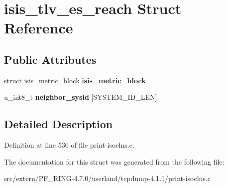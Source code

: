 \hypertarget{structisis__tlv__es__reach}{
\section{isis\_\-tlv\_\-es\_\-reach Struct Reference}
\label{structisis__tlv__es__reach}
}
\subsection*{Public Attributes}
\begin{DoxyCompactItemize}
\item 
\hypertarget{structisis__tlv__es__reach_a25013ad5e96d246910fb5a57a9937166}{
struct \hyperlink{structisis__metric__block}{isis\_\-metric\_\-block} {\bfseries isis\_\-metric\_\-block}}
\label{structisis__tlv__es__reach_a25013ad5e96d246910fb5a57a9937166}

\item 
\hypertarget{structisis__tlv__es__reach_a9304c6bbc57c3f4236fbcda94a3ffc1e}{
u\_\-int8\_\-t {\bfseries neighbor\_\-sysid} \mbox{[}SYSTEM\_\-ID\_\-LEN\mbox{]}}
\label{structisis__tlv__es__reach_a9304c6bbc57c3f4236fbcda94a3ffc1e}

\end{DoxyCompactItemize}


\subsection{Detailed Description}


Definition at line 530 of file print-\/isoclns.c.



The documentation for this struct was generated from the following file:\begin{DoxyCompactItemize}
\item 
src/extern/PF\_\-RING-\/4.7.0/userland/tcpdump-\/4.1.1/print-\/isoclns.c\end{DoxyCompactItemize}
